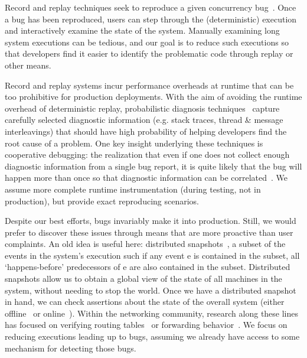  Record and replay
techniques seek to reproduce a given concurrency
bug~\cite{zamfir2011debug,Zamfir:2010:EST:1755913.1755946,altekar2009odr,park2009pres,Yuan:2010:SED:1736020.1736038,ofrewind}.
Once a bug has been
reproduced, users can step through the (deterministic) execution and interactively examine the
state of the system.
Manually examining long system executions can be tedious, and our goal is to
reduce such executions so that developers find it easier to identify the
problematic code through replay or other means.

 Record and replay systems incur
performance overheads at runtime that can be too prohibitive for production deployments.
With the aim of avoiding the runtime overhead of deterministic replay, probabilistic diagnosis
techniques~\cite{Yuan:2010:SED:1736020.1736038,sangmin,kasikci2015failure}
capture carefully selected diagnostic information (e.g. stack traces,
thread \& message interleavings) that should have high
probability of helping developers find the root cause of a problem. One key insight
underlying these techniques is cooperative debugging: the realization that
even if one does not collect enough diagnostic information from a single bug report,
it is quite likely that the bug will happen more than once so that diagnostic
information can be correlated~\cite{coop_debugging}.
We assume more complete runtime instrumentation (during testing, not in production), but provide exact reproducing scenarios.

 Despite our best efforts, bugs invariably make it into production. Still,
we would prefer to discover these issues through means that are more
proactive than user complaints. An old idea is useful here: distributed
snapshots~\cite{Chandy:1985:DSD:214451.214456},
a subset of the events in
the system's execution such if any event e is contained in the subset, all
`happens-before' predecessors of e are also contained in the subset.
Distributed snapshots allow us to obtain a global view of the state of all
machines in the system, without needing to stop the world. Once we have a
distributed snapshot in hand, we can check assertions about the state of the
overall system (either offline~\cite{Liu07widschecker} or online~\cite{d3s}).
Within the networking community, research along these lines has focused on
verifying routing tables~\cite{hsa,hsa_realtime,anteater,khurshid2012veriflow}
or forwarding behavior~\cite{Zeng:2012:ATP:2413176.2413205,libra}. We focus on
reducing executions leading up to bugs, assuming we already have access to
some mechanism for detecting those bugs.


